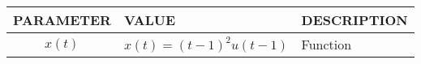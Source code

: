 \footnotesize
\begin{tabular}{|p{2cm}|p{2.5cm}|p{2.3cm}|}
    \hline
    PARAMETER & VALUE & DESCRIPTION  \\ \hline
    $$x(t)$$ & $$x(t)=(t-1)^2u(t-1)$$ & Function\\ \hline
  \end{tabular}

